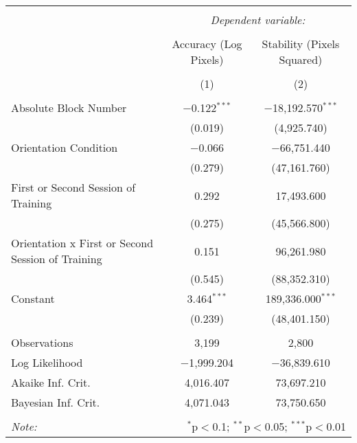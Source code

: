 
\begin{table}[!htbp] \centering 
  \caption{} 
  \label{} 
\begin{tabular}{@{\extracolsep{5pt}}lcc} 
\\[-1.8ex]\hline 
\hline \\[-1.8ex] 
 & \multicolumn{2}{c}{\textit{Dependent variable:}} \\ 
\cline{2-3} 
\\[-1.8ex] & Accuracy (Log Pixels) & Stability (Pixels Squared) \\ 
\\[-1.8ex] & (1) & (2)\\ 
\hline \\[-1.8ex] 
 Absolute Block Number & $-$0.122$^{***}$ & $-$18,192.570$^{***}$ \\ 
  & (0.019) & (4,925.740) \\ 
  Orientation Condition & $-$0.066 & $-$66,751.440 \\ 
  & (0.279) & (47,161.760) \\ 
  First or Second Session of Training & 0.292 & 17,493.600 \\ 
  & (0.275) & (45,566.800) \\ 
  Orientation x First or Second Session of Training & 0.151 & 96,261.980 \\ 
  & (0.545) & (88,352.310) \\ 
  Constant & 3.464$^{***}$ & 189,336.000$^{***}$ \\ 
  & (0.239) & (48,401.150) \\ 
 \hline \\[-1.8ex] 
Observations & 3,199 & 2,800 \\ 
Log Likelihood & $-$1,999.204 & $-$36,839.610 \\ 
Akaike Inf. Crit. & 4,016.407 & 73,697.210 \\ 
Bayesian Inf. Crit. & 4,071.043 & 73,750.650 \\ 
\hline 
\hline \\[-1.8ex] 
\textit{Note:}  & \multicolumn{2}{r}{$^{*}$p$<$0.1; $^{**}$p$<$0.05; $^{***}$p$<$0.01} \\ 
\end{tabular} 
\end{table} 
